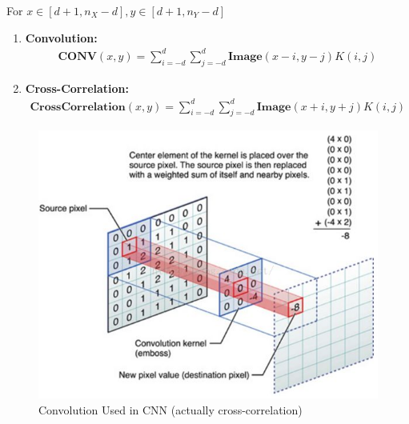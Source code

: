 \documentclass[11pt,a4paper]{article}
\begin{document}
For $x\in [d+1,n_X-d],y\in [d+1,n_Y-d]$
\begin{enumerate}
    \item \textbf{Convolution:}
    \begin{equation}
        \begin{aligned}
            \textbf{CONV}(x,y)=\sum_{i=-d}^d\sum_{j=-d}^d \textbf{Image}(x-i,y-j)K(i,j)
        \end{aligned}
        \nonumber
    \end{equation}
    \item \textbf{Cross-Correlation:}
    \begin{equation}
        \begin{aligned}
            \textbf{CrossCorrelation}(x,y)=\sum_{i=-d}^d\sum_{j=-d}^d \textbf{Image}(x+i,y+j)K(i,j)
        \end{aligned}
        \nonumber
    \end{equation}
\end{enumerate}

\begin{center}\begin{figure}[htbp]
    \centering
    \includegraphics[scale=0.5]{convolution.jpeg}
    \caption{Convolution Used in CNN (actually cross-correlation)}
    \label{}
\end{figure}\end{center}
\end{document}
